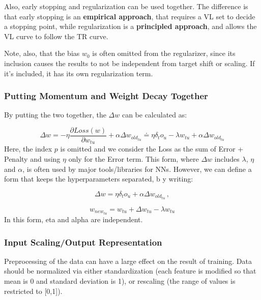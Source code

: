 Also, early stopping and regularization can be used together. The difference is that early stopping is an \textbf{empirical approach}, that requires a VL set to decide a stopping point, while regularization is a \textbf{principled approach}, and allows the VL curve to follow the TR curve.

Note, also, that the bias $w_0$ is often omitted from the regularizer, since its inclusion causes the results to not be independent from target shift or scaling. If it's included, it has its own regularization term.

\subsubsection{Putting Momentum and Weight Decay Together}

By putting the two together, the $\Delta w$ can be calculated as:

\begin{equation*}
    \Delta w = -\eta \dfrac{\partial Loss(w)}{\partial w_{tu}} + \alpha \Delta w_{old_{tu}} \doteq \eta \delta_t o_u - \lambda w_{tu} + \alpha \Delta w_{old_{tu}}
\end{equation*}
Here, the index $p$ is omitted and we consider the Loss as the sum of Error + Penalty and using $\eta$ only for the Error term. This form, where $\Delta w$ includes $\lambda$, $\eta$ and $\alpha$, is often used by major tools/libraries for NNs. However, we can define a form that keeps the hyperparameters separated, b y writing:

\begin{equation*}
    \Delta w = \eta \delta_t o_u + \alpha \Delta w_{old_{tu}} \, ,
\end{equation*}

\begin{equation*}
    w_{new_{tu}} = w_{tu} + \Delta w_{tu} - \lambda w_{tu} 
\end{equation*}
In this form, eta and alpha are independent.

\subsubsection{Input Scaling/Output Representation}

Preprocessing of the data can have a large effect on the result of training. Data should be normalized via either standardization (each feature is modified so that mean is 0 and standard deviation is 1), or rescaling (the range of values is restricted to [0,1]).

